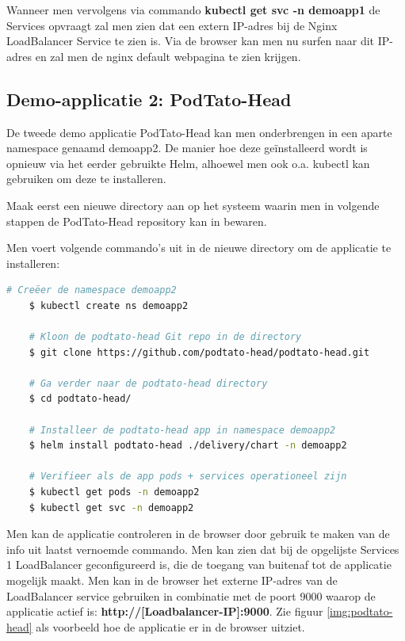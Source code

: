 Wanneer men vervolgens via commando {\bf kubectl get svc -n demoapp1} de Services opvraagt zal men zien dat een extern IP-adres bij de Nginx LoadBalancer Service te zien is. Via de browser kan men nu surfen naar dit IP-adres en zal men de nginx default webpagina te zien krijgen. 

\subsection{Demo-applicatie 2: PodTato-Head}

De tweede demo applicatie PodTato-Head kan men onderbrengen in een aparte namespace genaamd demoapp2. De manier hoe deze geïnstalleerd wordt is opnieuw via het eerder gebruikte Helm, alhoewel men ook o.a. kubectl kan gebruiken om deze te installeren. \autocite{Gavant2022}

Maak eerst een nieuwe directory aan op het systeem waarin men in volgende stappen de PodTato-Head repository kan in bewaren. 

Men voert volgende commando's uit in de nieuwe directory om de applicatie te installeren:
\begin{lstlisting}[language=bash]
    # Creëer de namespace demoapp2
    $ kubectl create ns demoapp2
    
    # Kloon de podtato-head Git repo in de directory
    $ git clone https://github.com/podtato-head/podtato-head.git
    
    # Ga verder naar de podtato-head directory
    $ cd podtato-head/
    
    # Installeer de podtato-head app in namespace demoapp2
    $ helm install podtato-head ./delivery/chart -n demoapp2 
    
    # Verifieer als de app pods + services operationeel zijn
    $ kubectl get pods -n demoapp2
    $ kubectl get svc -n demoapp2
\end{lstlisting} 

Men kan de applicatie controleren in de browser door gebruik te maken van de info uit laatst vernoemde commando. Men kan zien dat bij de opgelijste Services 1 LoadBalancer geconfigureerd is, die de toegang van buitenaf tot de applicatie mogelijk maakt. Men kan in de browser het externe IP-adres van de LoadBalancer service gebruiken in combinatie met de poort 9000 waarop de applicatie actief is: {\bf http://[Loadbalancer-IP]:9000}. \newline Zie figuur \ref{img:podtato-head} als voorbeeld hoe de applicatie er in de browser uitziet. 

